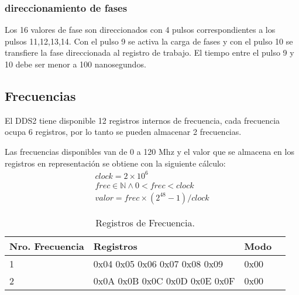 \subsubsection{direccionamiento de fases}
Los 16 valores de fase son direccionados con 4 pulsos correspondientes a los 
pulsos 11,12,13,14. Con el pulso 9 se activa la carga de fases y con el pulso 10
se transfiere la fase direccionada al registro de trabajo.
El tiempo entre el pulso 9 y 10 debe ser menor a 100 nanosegundos.

\subsection{Frecuencias}

El DDS2 tiene disponible 12 registros internos de frecuencia, cada frecuencia ocupa 6 registros, 
por lo tanto se pueden almacenar 2 frecuencias.

Las frecuencias disponibles van de 0 a 120 Mhz y el valor que se almacena en los registros
en representaci\'on se obtiene con la siguiente c\'alculo:
\noindent
\begin{gather}
    clock = 2 \times 10^{6} \\
    frec \in \mathbb{N} \land 0 < frec < clock\\
    valor = frec \times (2^{48} -1 ) / clock
\end{gather}

\begin{table}[ht]
    \centering
    \begin{tabular}{|l|l|l|l|}
    \hline
    Nro. Frecuencia    & Registros       & Modo \\
    \hline
     1 & 0x04 0x05 0x06 0x07 0x08 0x09   & 0x00 \\
    \hline
     2 & 0x0A 0x0B 0x0C 0x0D 0x0E 0x0F   & 0x00 \\
    \hline
\end{tabular}
\caption{\label{tab:registros_frec}Registros de Frecuencia.}
\end{table}

